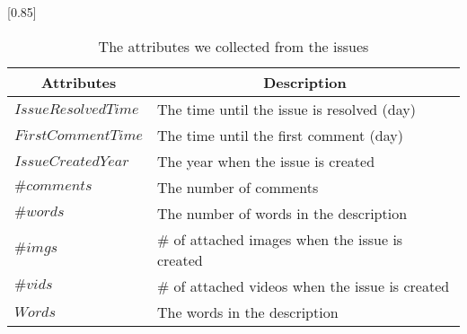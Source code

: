
\begin{table}[t]
    \begin{center}
    \caption{The attributes we collected from the issues}
    \scalebox{0.85}[0.85]{
    \begin{tabular}{ll} 
        \toprule
        \multicolumn{1}{c}{\textbf{Attributes}} & \multicolumn{1}{c}{\textbf{Description}} \\ 
        \midrule
        $IssueResolvedTime$ & The time until the issue is resolved (day) \\
        $FirstCommentTime$ & The time until the first comment (day) \\
        $IssueCreatedYear$ & The year when the issue is created \\
        $\#comments$ & The number of comments \\
        $\#words$ & The number of words in the description \\
        $\#imgs$ & \# of attached images when the issue is created \\
        $\#vids$ & \# of attached videos when the issue is created \\
        $Words$ &  The words in the description \\
        \bottomrule
    \end{tabular}
    }
    \label{tab:issue-attr}
    \end{center}
\end{table}
